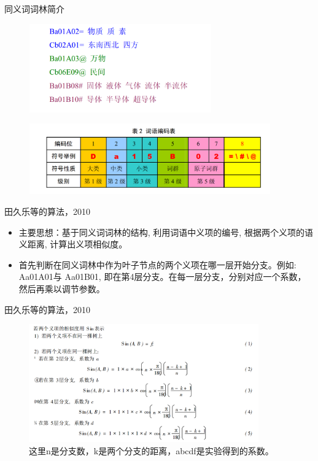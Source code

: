 \documentclass[aspectratio=169]{beamer} %
\begin{document}
    \begin{frame}{同义词词林简介}
    \begin{center}
      \begin{figure}
      \includegraphics[width=3.1in,height=1.5in]{cilin1.png}
      \end{figure}
      \begin{figure}
      \includegraphics[width=4.1in,height=1.2in]{cilin2.png}
      \end{figure}
      \end{center}
    \end{frame}

    \begin{frame}{田久乐等的算法，2010}
    \begin{center}
      \begin{itemize}
        \item 主要思想：基于同义词词林的结构, 利用词语中义项的编号, 根据两个义项的语义距离, 计算出义项相似度。\\
        \item 首先判断在同义词林中作为叶子节点的两个义项在哪一层开始分支。例如: Aa01A01与 Aa01B01, 即在第4层分支。在每一层分支，分别对应一个系数，然后再乘以调节参数。\\
      \end{itemize}
    \end{center}
    \end{frame}

    \begin{frame}{田久乐等的算法，2010}
    \begin{center}
      \begin{figure}
      \includegraphics[width=3.9in,height=2in]{cilin-method-2010.png}
      \caption{这里n是分支数，k是两个分支的距离，abcdf是实验得到的系数。}
      \end{figure}
      \end{center}
    \end{frame}
\end{document}
